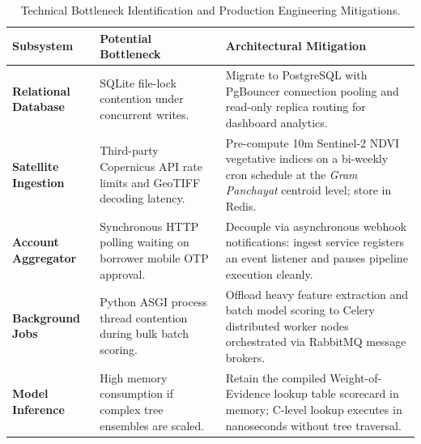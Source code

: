 \begin{table}[H]
\centering
\small
\renewcommand{\arraystretch}{1.2}
\begin{tabularx}{\textwidth}{p{3.2cm} p{3.4cm} X}
  \toprule
  \textbf{Subsystem} & \textbf{Potential Bottleneck} & \textbf{Architectural Mitigation} \\
  \midrule
  \textbf{Relational Database} & SQLite file-lock contention under concurrent writes. & Migrate to PostgreSQL with PgBouncer connection pooling and read-only replica routing for dashboard analytics. \\
  \addlinespace
  \textbf{Satellite Ingestion} & Third-party Copernicus API rate limits and GeoTIFF decoding latency. & Pre-compute 10m Sentinel-2 NDVI vegetative indices on a bi-weekly cron schedule at the \textit{Gram Panchayat} centroid level; store in Redis. \\
  \addlinespace
  \textbf{Account Aggregator} & Synchronous HTTP polling waiting on borrower mobile OTP approval. & Decouple via asynchronous webhook notifications: ingest service registers an event listener and pauses pipeline execution cleanly. \\
  \addlinespace
  \textbf{Background Jobs} & Python ASGI process thread contention during bulk batch scoring. & Offload heavy feature extraction and batch model scoring to Celery distributed worker nodes orchestrated via RabbitMQ message brokers. \\
  \addlinespace
  \textbf{Model Inference} & High memory consumption if complex tree ensembles are scaled. & Retain the compiled Weight-of-Evidence lookup table scorecard in memory; C-level lookup executes in nanoseconds without tree traversal. \\
  \bottomrule
\end{tabularx}
\caption{Technical Bottleneck Identification and Production Engineering Mitigations.}
\label{tab:bottleneck_analysis}
\end{table}
